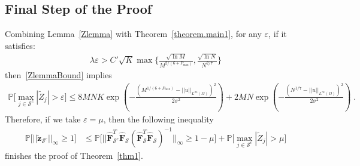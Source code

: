 \documentclass[a4paper,11pt]{article}
\newcommand{\bF}{\mathbf{F}}
\newcommand{\mS}{\mathcal{S}}
\theoremstyle{definition}
\begin{document}
\subsection{Final Step of the Proof}
Combining Lemma~\ref{Zlemma} with Theorem~\ref{theorem.main1},  for any $\varepsilon$, if it satisfies:
\begin{align*}
\lambda\varepsilon>C'\sqrt{K}\max\{\frac{\sqrt{\ln M}}{M^{2/(6+P_{\max})}},\frac{\sqrt{\ln N}}{N^{2/7}}\}
\end{align*}
then~\eqref{ZlemmaBound} implies
\begin{align*}
\mathbb{P}\Big[\max_{j\in \mS^c}|\widetilde{Z}_j|>\varepsilon\Big]\leq 8MNK \exp(-\frac{(M^{1/(6+P_{\max})}-||u||_{L^\infty(\Omega)})^2}{2\sigma^2})+2MN \exp(-\frac{(N^{1/7}-||u||_{L^\infty(\Omega)})^2}{2\sigma^2})\;.
\end{align*}
Therefore, if we take $\varepsilon= \mu$, then the following inequality
\begin{align*}
\mathbb{P}\Big[||\check{\mathbf{z}}_{\mS^c}||_\infty	\geq1\Big]&\leq \mathbb{P}\Big[||\widehat{\bF}_{\mS^c}^T\widehat{\bF}_\mS(\widehat{\bF}_{\mS}^T\widehat{\bF}_\mS)^{-1}||_\infty\geq 1-\mu\Big]+\mathbb{P}\Big[\max_{j\in \mS^c}|\widetilde{Z}_j|>\mu\Big]
\end{align*}
finishes the proof of Theorem~\ref{thm1}.
\end{document}

